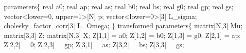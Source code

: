 \documentclass[
  12pt,
  letterpaper,
  DIV=11,
  numbers=noendperiod]{scrartcl}
\newenvironment{Shaded}{\begin{snugshade}}{\end{snugshade}}
\newcommand{\DataTypeTok}[1]{\textcolor[rgb]{0.68,0.00,0.00}{#1}}
\newcommand{\DecValTok}[1]{\textcolor[rgb]{0.68,0.00,0.00}{#1}}
\newcommand{\KeywordTok}[1]{\textcolor[rgb]{0.00,0.23,0.31}{#1}}
\newcommand{\NormalTok}[1]{\textcolor[rgb]{0.00,0.23,0.31}{#1}}
\begin{document}
\begin{Shaded}
\begin{Highlighting}[]
\KeywordTok{parameters}\NormalTok{\{}
  \DataTypeTok{real}\NormalTok{ a0;}
  \DataTypeTok{real}\NormalTok{ ap;}
  \DataTypeTok{real}\NormalTok{ as;}
  \DataTypeTok{real}\NormalTok{ b0;}
  \DataTypeTok{real}\NormalTok{ bs;}
  \DataTypeTok{real}\NormalTok{ g0;}
  \DataTypeTok{real}\NormalTok{ gp;}
  \DataTypeTok{real}\NormalTok{ gs;}
  \DataTypeTok{vector}\NormalTok{\textless{}}\KeywordTok{lower}\NormalTok{=}\DecValTok{0}\NormalTok{, }\KeywordTok{upper}\NormalTok{=}\DecValTok{1}\NormalTok{\textgreater{}[N] p;}
  \DataTypeTok{vector}\NormalTok{\textless{}}\KeywordTok{lower}\NormalTok{=}\DecValTok{0}\NormalTok{\textgreater{}[}\DecValTok{3}\NormalTok{] L\_sigma;}
  \DataTypeTok{cholesky\_factor\_corr}\NormalTok{[}\DecValTok{3}\NormalTok{] L\_Omega;}
\NormalTok{\}}
\KeywordTok{transformed parameters}\NormalTok{\{}
  \DataTypeTok{matrix}\NormalTok{[N,}\DecValTok{3}\NormalTok{] Mu;}
  \DataTypeTok{matrix}\NormalTok{[}\DecValTok{3}\NormalTok{,}\DecValTok{3}\NormalTok{] Z;}
  \DataTypeTok{matrix}\NormalTok{[N,}\DecValTok{3}\NormalTok{] X;}
\NormalTok{  Z[}\DecValTok{1}\NormalTok{,}\DecValTok{1}\NormalTok{] = a0;}
\NormalTok{  Z[}\DecValTok{1}\NormalTok{,}\DecValTok{2}\NormalTok{] = b0;}
\NormalTok{  Z[}\DecValTok{1}\NormalTok{,}\DecValTok{3}\NormalTok{] = g0;}
\NormalTok{  Z[}\DecValTok{2}\NormalTok{,}\DecValTok{1}\NormalTok{] = ap;}
\NormalTok{  Z[}\DecValTok{2}\NormalTok{,}\DecValTok{2}\NormalTok{] = }\DecValTok{0}\NormalTok{;}
\NormalTok{  Z[}\DecValTok{2}\NormalTok{,}\DecValTok{3}\NormalTok{] = gp;}
\NormalTok{  Z[}\DecValTok{3}\NormalTok{,}\DecValTok{1}\NormalTok{] = as;}
\NormalTok{  Z[}\DecValTok{3}\NormalTok{,}\DecValTok{2}\NormalTok{] = bs;}
\NormalTok{  Z[}\DecValTok{3}\NormalTok{,}\DecValTok{3}\NormalTok{] = gs;}


\end{Highlighting}
\end{Shaded}
\end{document}
